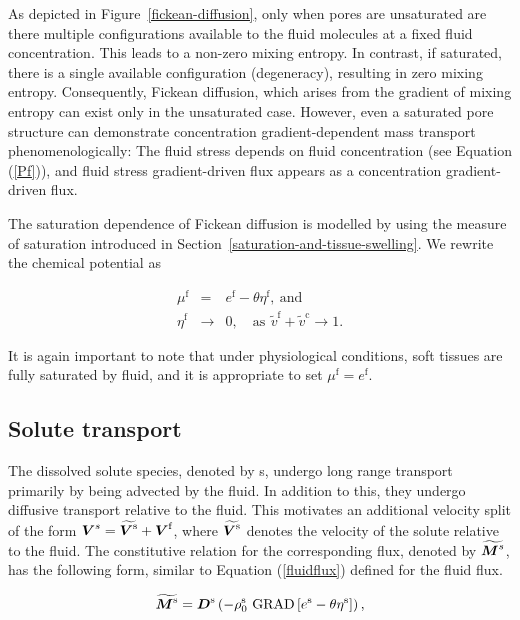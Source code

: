 As depicted in Figure~\ref{fickean-diffusion}, only when pores are
unsaturated are there multiple configurations available to the fluid
molecules at a fixed fluid concentration.  This leads to a non-zero
mixing entropy. In contrast, if saturated, there is a single available
configuration (degeneracy), resulting in zero mixing
entropy. Consequently, Fickean diffusion, which arises from the
gradient of mixing entropy can exist only in the unsaturated
case. However, even a saturated pore structure can demonstrate
concentration gradient-dependent mass transport phenomenologically:
The fluid stress depends on fluid concentration (see Equation
(\ref{Pf})), and fluid stress gradient-driven flux appears as a
concentration gradient-driven flux.

The saturation dependence of Fickean diffusion is modelled by using
the measure of saturation introduced in
Section~\ref{saturation-and-tissue-swelling}. We rewrite the chemical
potential as

\begin{eqnarray}
\mu^\mathrm{f} &=&  
e^\mathrm{f} - \theta\eta^\mathrm{f},\ \mathrm{and}\nonumber\\
\eta^\mathrm{f} &\to& 0, \quad \mbox{as}\ \, \tilde{v}^\mathrm{f} +
\tilde{v}^\mathrm{c} \to 1.
\label{fickeanmobility}
\end{eqnarray}

\noindent It is again important to note that under physiological
conditions, soft tissues are fully saturated by fluid, and it is
appropriate to set $\mu^\mathrm{f} = e^\mathrm{f}$.

\subsection{Solute transport}
\label{solute-transport}

The dissolved solute species, denoted by s, undergo long range
transport primarily by being advected by the fluid. In addition to
this, they undergo diffusive transport relative to the fluid. This
motivates an additional velocity split of the form
\mbox{$\mbox{\boldmath$ V$}^s=\widetilde{\mbox{\boldmath$ V$}^\mathrm{s}}+\mbox{\boldmath$ V$}^\mathrm{f}$}, where
$\widetilde{\mbox{\boldmath$ V$}^\mathrm{s}}$ denotes the velocity of the solute
relative to the fluid. The constitutive relation for the corresponding
flux, denoted by $\widetilde{\mbox{\boldmath$ M$}^s}$, has the following form, similar
to Equation (\ref {fluidflux}) defined for the fluid flux.

\begin{equation}
\widetilde{\mbox{\boldmath$ M$}^\mathrm{s}} = \mbox{\boldmath$ D$}^\mathrm{s}\left( -
\rho^\mathrm{s}_0\ \mathrm{GRAD}\left[e^\mathrm{s} -
  \theta\eta^\mathrm{s}\right]\right),
\label{soluteflux}
\end{equation}

